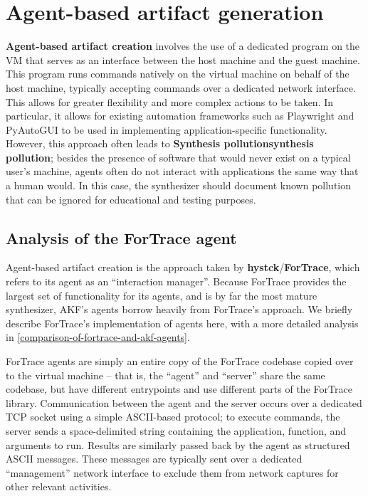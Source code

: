 \documentclass[letterpaper,12pt]{report}
\begin{document}
\section{Agent-based artifact
generation}\label{agent-based-artifact-generation}

\textbf{Agent-based artifact creation} involves the use of a dedicated
program on the VM that serves as an interface between the host machine
and the guest machine. This program runs commands natively on the
virtual machine on behalf of the host machine, typically accepting
commands over a dedicated network interface. This allows for greater
flexibility and more complex actions to be taken. In particular, it
allows for existing automation frameworks such as Playwright and
PyAutoGUI to be used in implementing application-specific functionality.
However, this approach often leads to \textbf{Synthesis
pollution\textbar synthesis pollution}; besides the presence of software
that would never exist on a typical user's machine, agents often do not
interact with applications the same way that a human would. In this
case, the synthesizer should document known pollution that can be
ignored for educational and testing purposes.

\subsection{Analysis of the ForTrace
agent}\label{analysis-of-the-fortrace-agent}

Agent-based artifact creation is the approach taken by
\textbf{hystck}/\textbf{ForTrace}, which refers to its agent as an
``interaction manager''. Because ForTrace provides the largest set of
functionality for its agents, and is by far the most mature synthesizer,
AKF's agents borrow heavily from ForTrace's approach. We briefly
describe ForTrace's implementation of agents here, with a more detailed
analysis in \autoref{comparison-of-fortrace-and-akf-agents}.

ForTrace agents are simply an entire copy of the ForTrace codebase
copied over to the virtual machine -- that is, the ``agent'' and
``server'' share the same codebase, but have different entrypoints and
use different parts of the ForTrace library. Communication between the
agent and the server occurs over a dedicated TCP socket using a simple
ASCII-based protocol; to execute commands, the server sends a
space-delimited string containing the application, function, and
arguments to run. Results are similarly passed back by the agent as
structured ASCII messages. These messages are typically sent over a
dedicated ``management'' network interface to exclude them from network
captures for other relevant activities.
\end{document}
